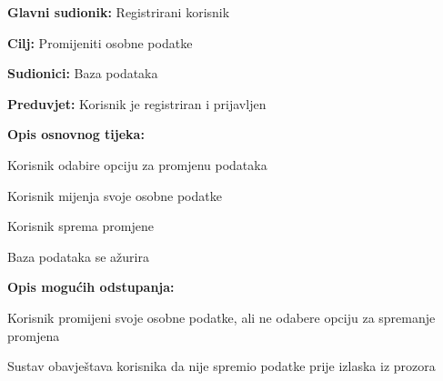 					\noindent {}
					\begin{packed_item}
						
						\item \textbf{Glavni sudionik: } Registrirani korisnik
						\item  \textbf{Cilj:} Promijeniti osobne podatke
						\item  \textbf{Sudionici:} Baza podataka
						\item  \textbf{Preduvjet:} Korisnik je registriran i prijavljen
						\item  \textbf{Opis osnovnog tijeka:}
						
						\item[] \begin{packed_enum}
							
							\item Korisnik odabire opciju za promjenu podataka
							\item Korisnik mijenja svoje osobne podatke
							\item Korisnik sprema promjene
							\item Baza podataka se ažurira
						\end{packed_enum}
						
						\item  \textbf{Opis mogućih odstupanja:}
						
						\item[] \begin{packed_item}
							
							\item[2.a] Korisnik promijeni svoje osobne podatke, ali ne odabere opciju za spremanje promjena
							\item[] \begin{packed_enum}
								
								\item Sustav obavještava korisnika da nije spremio podatke prije izlaska iz prozora
								
							\end{packed_enum}
						\end{packed_item}
					\end{packed_item}
					
